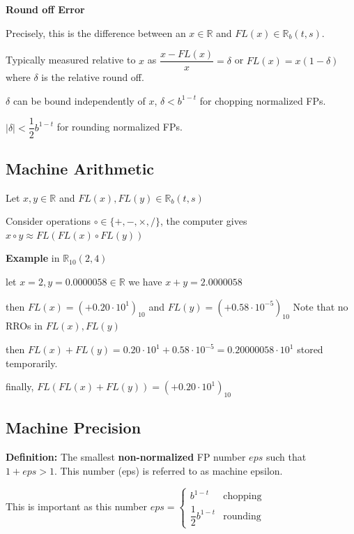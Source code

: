\documentclass{article}
\begin{document}
\textbf{Round off Error}

Precisely, this is the difference between an $x \in \mathbb R$ and $FL(x) \in \mathbb R_b(t, s)$. 

Typically measured relative to $x$ as $\dfrac{x - FL(x)}{x} = \delta$ or $FL(x) = x(1 - \delta)$ where $\delta$ is the relative round off. 

\vspace{0.2cm}

$\delta$ can be bound independently of $x$, $\delta < b^{1 - t}$ for chopping normalized FPs.

$|\delta| < \dfrac{1}{2}b^{1 - t}$ for rounding normalized FPs.

\subsection{Machine Arithmetic}

Let $x, y \in \mathbb R$ and $FL(x), FL(y) \in \mathbb R_b(t,s)$

\vspace{0.2cm}

Consider operations $\circ \in \{ + , - , \times, /\}$, the computer gives $x \circ y \approx FL(FL(x) \circ FL(y))$

\textbf{Example} in $\mathbb R_{10} (2, 4)$

let $x = 2, y = 0.0000058 \in \mathbb R$ we have $x + y = 2.0000058$

then $FL(x) = (+0.20 \cdot 10^1)_{10}$ and $FL(y) = (+0.58 \cdot 10^{-5})_{10}$ Note that no RROs in $FL(x), FL(y)$

\vspace{0.2cm}

then $FL(x) + FL(y) = 0.20 \cdot 10^1 + 0.58 \cdot 10^{-5} = 0.20000058 \cdot 10^1$ stored temporarily.

finally, $FL(FL(x) + FL(y)) = (+0.20 \cdot 10^1)_{10}$

\subsection{Machine Precision}

\textbf{Definition:} The smallest \textbf{non-normalized} FP number $eps$ such that $1 + eps > 1$. This number (eps) is referred to as machine epsilon.

This is important as this number $eps = \begin{cases}
b^{1 - t} & \text{chopping}\\
\dfrac{1}{2}b^{1 - t} & \text{rounding}
\end{cases}$
\end{document}
